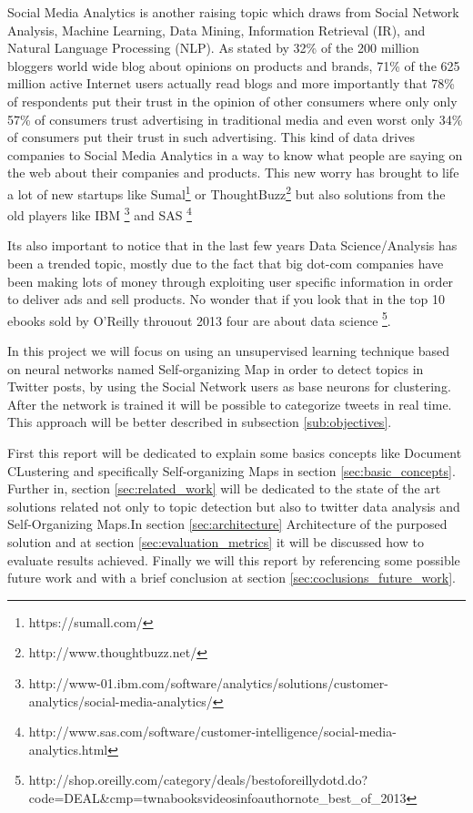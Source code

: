 Social Media Analytics is another raising topic which draws from Social Network Analysis, Machine Learning, Data Mining, Information Retrieval (IR), and Natural Language Processing (NLP). As stated by \citet{Melville2009} 32\% of the 200 million bloggers world wide blog about opinions on products and brands, 71\% of the 625 million active Internet users actually read blogs and more importantly that 78\% of respondents put their trust in the opinion of other consumers where only only 57\% of consumers trust advertising in traditional media and even worst only 34\% of consumers put their trust in such advertising. This kind of data drives companies to Social Media Analytics in a way to know what people are saying on the web about their companies and products. This new worry has brought to life a lot of new startups like Sumal\footnote{https://sumall.com/} or ThoughtBuzz\footnote{http://www.thoughtbuzz.net/} but also solutions from the old players like IBM \footnote{http://www-01.ibm.com/software/analytics/solutions/customer-analytics/social-media-analytics/} and SAS \footnote{http://www.sas.com/software/customer-intelligence/social-media-analytics.html}

Its also important to notice that in the last few years Data Science/Analysis has been a trended topic, mostly due to the fact that big dot-com companies have been making lots of money through exploiting user specific information in order to deliver ads and sell products. No wonder that if you look that in the top 10 ebooks sold by O'Reilly throuout 2013 four are about data science \footnote{http://shop.oreilly.com/category/deals/best\-of\-oreilly\-dotd.do?code=DEAL\&cmp=tw\-na\-books\-videos\-info\-authornote\_best\_of\_2013}.

In this project we will focus on using an unsupervised learning technique based on neural networks named Self-organizing Map \cite{Kohonen1990} in order to detect topics in Twitter posts, by using the Social Network users as base neurons for clustering. After the network is trained it will be possible to categorize tweets in real time. This approach will be better described in subsection \ref{sub:objectives}.

First this report will be dedicated to explain some basics concepts like Document CLustering and specifically Self-organizing Maps in section \ref{sec:basic_concepts}.  Further in, section \ref{sec:related_work} will be dedicated to the state of the art solutions related not only to topic detection but also to twitter data analysis and Self-Organizing Maps.In section \ref{sec:architecture} Architecture of the purposed solution and  at section \ref{sec:evaluation_metrics} it will be discussed how to evaluate results achieved. Finally we will this report by referencing some possible future work and with a brief conclusion at section \ref{sec:coclusions_future_work}.

